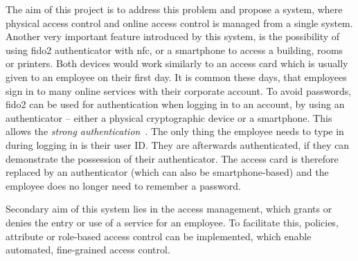 The aim of this project is to address this problem and propose a system, where physical access control and online access control is managed from a single system. Another very important feature introduced by this system, is the possibility of using \acrshort{fido}2 authenticator with \acrshort{nfc}, or a smartphone to access a building, rooms or printers. Both devices would work similarly to an access card which is usually given to an employee on their first day. It is common these days, that employees sign in to many online services with their corporate account. To avoid passwords, \acrshort{fido}2 can be used for authentication when logging in to an account, by using an authenticator -- either a physical cryptographic device or a smartphone. This allows the \textit{strong authentication}~\cite{McDowell2017WhyAlliance}. The only thing the employee needs to type in during logging in is their user ID. They are afterwards authenticated, if they can demonstrate the possession of their  authenticator. The access card is therefore replaced by an authenticator (which can also be smartphone-based) and the employee does no longer need to remember a password.

Secondary aim of this system lies in the access management, which grants or denies the entry or use of a service for an employee. To facilitate this, policies, attribute or role-based access control can be implemented, which enable automated, fine-grained access control.





